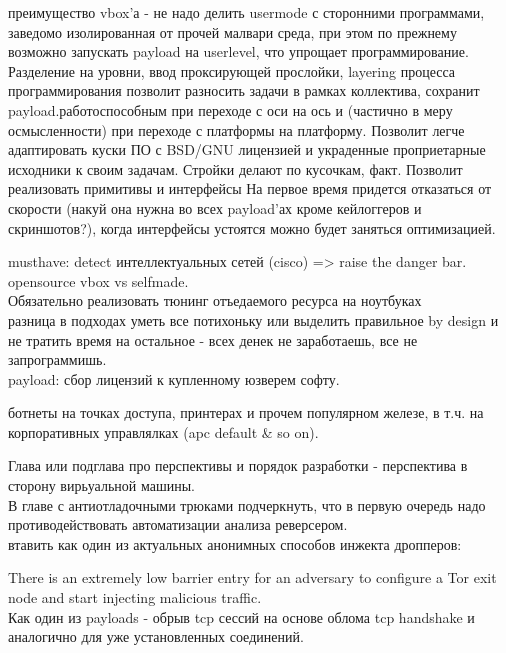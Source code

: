 преимущество vbox'а - не надо делить usermode с сторонними программами, заведомо изолированная от прочей малвари среда, при этом по прежнему возможно запускать payload на userlevel, что упрощает программирование. Разделение на уровни, ввод проксирующей прослойки, layering процесса программирования позволит разносить задачи в рамках коллектива, сохранит payload.работоспособным при переходе с оси на ось и (частично в меру осмысленности) при переходе с платформы на платформу. Позволит легче адаптировать куски ПО с BSD/GNU лицензией и украденные проприетарные исходники к своим задачам. Стройки делают по кусочкам, факт.
Позволит реализовать примитивы и интерфейсы
На первое время придется отказаться от скорости (накуй она нужна во всех payload'ах кроме кейлоггеров и скриншотов?),
когда интерфейсы устоятся можно будет заняться оптимизацией.

musthave: detect интеллектуальных сетей (cisco) => raise the danger bar.\\

opensource vbox vs selfmade.\\

Обязательно реализовать тюнинг отъедаемого ресурса на ноутбуках\\

разница в подходах уметь все потихоньку или выделить правильное by design и не тратить время на остальное - всех
денек не заработаешь, все не запрограммишь.\\

payload: сбор лицензий к купленному юзверем софту.

ботнеты на точках доступа, принтерах и прочем популярном железе, в т.ч. на корпоративных управлялках (apc default & so on).

Глава или подглава про перспективы и порядок разработки - перспектива в сторону вирьуальной машины.\\

В главе с антиотладочными трюками подчеркнуть, что в первую очередь надо противодействовать автоматизации анализа
реверсером.\\

втавить как один из актуальных анонимных способов инжекта дропперов:

There is an extremely low barrier entry for an adversary to configure a Tor exit node and start injecting malicious traffic. \\

Как один из payloads - обрыв tcp сессий на основе облома tcp handshake и аналогично для уже установленных соединений.\\

